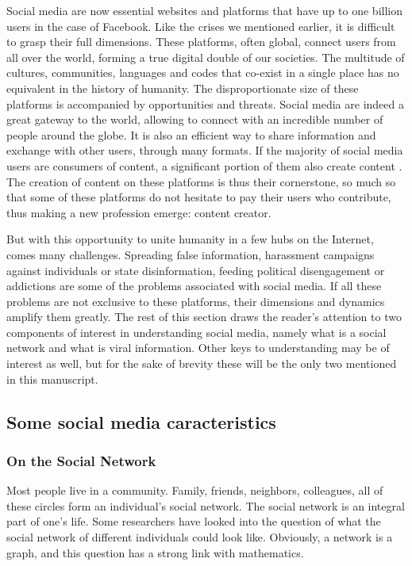 Social media are now essential websites and platforms that have up to one billion users in the case of Facebook.
Like the crises we mentioned earlier, it is difficult to grasp their full dimensions.
These platforms, often global, connect users from all over the world, forming a true digital double of our societies.
The multitude of cultures, communities, languages and codes that co-exist in a single place has no equivalent in the history of humanity.
The disproportionate size of these platforms is accompanied by opportunities and threats.
Social media are indeed a great gateway to the world, allowing to connect with an incredible number of people around the globe.
It is also an efficient way to share information and exchange with other users, through many formats.
If the majority of social media users are consumers of content, a significant portion of them also create content \cite{fuchsSocialMediaCritical2021}.
The creation of content on these platforms is thus their cornerstone, so much so that some of these platforms do not hesitate to pay their users who contribute, thus making a new profession emerge: content creator.

But with this opportunity to unite humanity in a few hubs on the Internet, comes many challenges.
Spreading false information, harassment campaigns against individuals or state disinformation, feeding political disengagement or addictions are some of the problems associated with social media.
If all these problems are not exclusive to these platforms, their dimensions and dynamics amplify them greatly.
The rest of this section draws the reader's attention to two components of interest in understanding social media, namely what is a social network and what is viral information.
Other keys to understanding may be of interest as well, but for the sake of brevity these will be the only two mentioned in this manuscript.

\subsection{Some social media caracteristics}
\subsubsection{On the Social Network}
Most people live in a community.
Family, friends, neighbors, colleagues, all of these circles form an individual's social network.
The social network is an integral part of one's life.
Some researchers have looked into the question of what the social network of different individuals could look like.
Obviously, a network is a graph, and this question has a strong link with mathematics.

